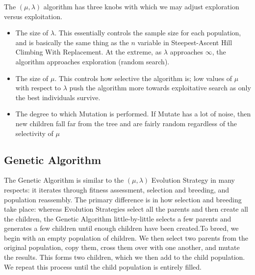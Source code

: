                 The $(\mu, \lambda)$ algorithm has three knobs with which we may adjust exploration versus exploitation.

                \begin{itemize}
                    \item The size of $\lambda$. This essentially controls the sample size for each population, and is basically the same thing as the $n$ variable in Steepest-Ascent Hill Climbing With Replacement. At the extreme, as $\lambda$ approaches $\infty$, the algorithm approaches exploration (random search).
                    \item The size of $\mu$. This controls how selective the algorithm is; low values of $\mu$ with respect to $\lambda$ push the algorithm more towards exploitative search as only the best individuals survive.
                    \item The degree to which Mutation is performed. If Mutate has a lot of noise, then new children fall far from the tree and are fairly random regardless of the selectivity of $\mu$
                \end{itemize}

            \subsection{Genetic Algorithm}
                The Genetic Algorithm is similar to the $(\mu, \lambda)$ Evolution Strategy in many respects: it iterates through fitness assessment, selection and breeding, and population reassembly. The primary difference is in how selection and breeding take place: whereas Evolution Strategies select all the parents and then create all the children, the Genetic Algorithm little-by-little selects a few parents and generates a few children until enough children have been created.To breed, we begin with an empty population of children. We then select two parents from the original population, copy them, cross them over with one another, and mutate the results. This forms two children, which we then add to the child population. We repeat this process until the child population is entirely filled.

